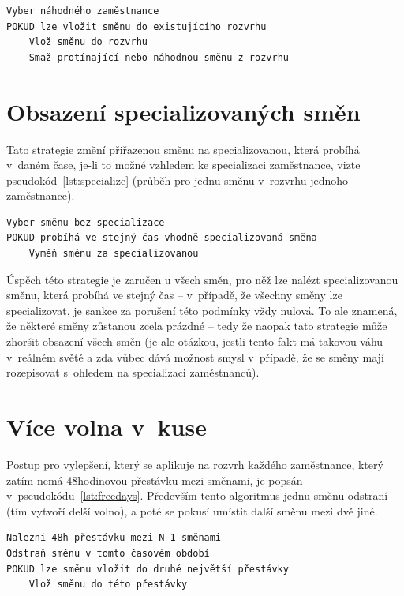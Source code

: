 \documentclass[a4paper,11pt,openany,twoside]{book}
\begin{document}
\begin{lstlisting}[caption={Strategie pro vylepšování obsazení všech směn}, label={lst:noemptyshifts}]
Vyber náhodného zaměstnance
POKUD lze vložit směnu do existujícího rozvrhu
	Vlož směnu do rozvrhu
	Smaž protínající nebo náhodnou směnu z rozvrhu
\end{lstlisting}

\section{Obsazení specializovaných směn}
Tato strategie změní přiřazenou směnu na specializovanou, která probíhá v~daném čase, je-li to možné vzhledem ke specializaci zaměstnance, vizte pseudokód~\ref{lst:specialize} (průběh pro jednu směnu v~rozvrhu jednoho zaměstnance).

\begin{lstlisting}[caption={Strategie pro obsazení specializovaných směn}, label={lst:specialize}]
Vyber směnu bez specializace
POKUD probíhá ve stejný čas vhodně specializovaná směna
	Vyměň směnu za specializovanou
\end{lstlisting}

Úspěch této strategie je zaručen u všech směn, pro něž lze nalézt specializovanou směnu, která probíhá ve stejný čas – v~případě, že všechny směny lze specializovat, je sankce za porušení této podmínky vždy nulová. To ale znamená, že některé směny zůstanou zcela prázdné – tedy že naopak tato strategie může zhoršit obsazení všech směn  (je ale otázkou, jestli tento fakt má takovou váhu v~reálném světě a zda vůbec dává možnost  smysl v~případě, že se směny mají rozepisovat s~ohledem na specializaci zaměstnanců).

\section{Více volna v~kuse}\label{sec:freedays}
Postup pro vylepšení, který se aplikuje na rozvrh každého zaměstnance, který zatím nemá 48hodinovou přestávku mezi směnami, je popsán v~pseudokódu~\ref{lst:freedays}. Především tento algoritmus jednu směnu odstraní (tím vytvoří delší volno), a poté se pokusí umístit další směnu mezi dvě jiné.

\begin{lstlisting}[caption={Strategie pro více volna v~kuse}, label={lst:freedays}]
Nalezni 48h přestávku mezi N-1 směnami
Odstraň směnu v tomto časovém období
POKUD lze směnu vložit do druhé největší přestávky
	Vlož směnu do této přestávky
\end{lstlisting}
\end{document}
